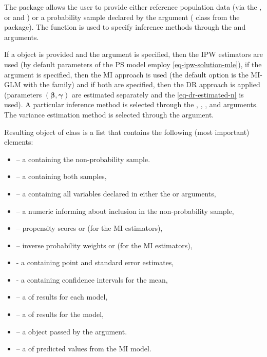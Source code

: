 \documentclass[
]{jss}
\begin{document}
The package allows the user to provide either reference population data
(via the , or  and )
or a probability sample declared by the  argument
( class from the  package). The
 function is used to specify inference methods through the
 and  arguments.

If a  object is provided and the 
argument is specified, then the IPW estimators are used (by default
parameters of the PS model employ \eqref{eq-ipw-solution-mle}), if the
 argument is specified, then the MI approach is used (the
default option is the MI-GLM with the  family) and if
both are specified, then the DR approach is applied (parameters
\((\boldsymbol{\beta}, \boldsymbol{\gamma})\) are estimated separately
and the \eqref{eq-dr-estimated-n} is used). A particular inference
method is selected through the ,
, ,
 and  arguments. The
variance estimation method is selected through the
 argument.

Resulting object of class  is a list that contains the
following (most important) elements:

\begin{itemize}
\item {} -- a  containing the non-probability sample.
\item {} -- a  containing both samples,
\item {} -- a  containing all variables declared in either the  or  arguments,
\item {} -- a numeric  informing about inclusion in the non-probability sample,
\item {} -- propensity scores or  (for the MI estimators),
\item {} -- inverse probability weights or  (for the MI estimators),
\item {} - a  containing point and standard error estimates,
\item {} - a  containing confidence intervals for the mean,
\item {} -- a  of results for each  model,
\item {} -- a  of results for the  model,
\item {} -- a  object passed by the  argument.
\item {} -- a  of predicted values from the MI model.
\end{itemize}
\end{document}
